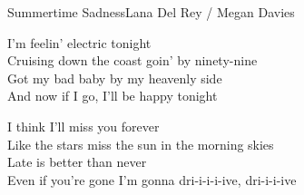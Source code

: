 \begin{song}{Summertime Sadness}{Lana Del Rey / Megan Davies}
\vspace{3mm}
\begin{guitar}
I'm feelin' electric tonight\\
Cruising down the coast goin' by ninety-nine\\
Got my bad baby by my heavenly side\\
And now if I go, I'll be happy tonight\\
\end{guitar}

\vspace{3mm}



\vspace{3mm}
\begin{guitar}
I think I'll miss you forever\\
Like the stars miss the sun in the morning skies\\
Late is better than never\\
Even if you're gone I'm gonna dri-i-i-i-ive, dri-i-i-ive\\
\end{guitar}


\vspace{3mm}



\end{song}
